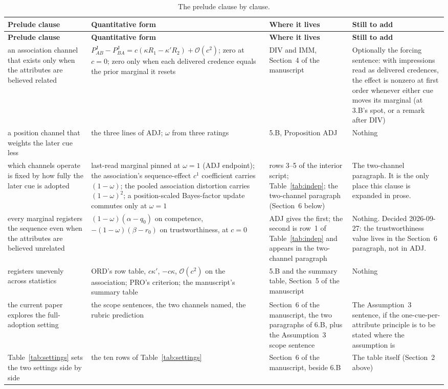 \documentclass[11pt,a4paper]{article}
\newcommand{\PJ}{P^{\mathrm{J}}}
\newcommand{\bigO}{\mathcal{O}}
\begin{document}
\small
\begin{longtable}{@{}L{3.3cm}L{4.2cm}L{4.0cm}L{4.4cm}@{}}
\caption{The prelude clause by clause.}\label{tab:map}\\
\toprule
\textbf{Prelude clause} & \textbf{Quantitative form} & \textbf{Where it lives} & \textbf{Still to add} \\
\midrule
\endfirsthead
\toprule
\textbf{Prelude clause} & \textbf{Quantitative form} & \textbf{Where it lives} & \textbf{Still to add} \\
\midrule
\endhead
an association channel that exists only when the attributes are believed
related &
$\PJ_{AB}-\PJ_{BA}=c(\kappa R_1-\kappa'R_2)+\bigO(c^2)$; zero at $c=0$; zero
only when each delivered credence equals the prior marginal it resets &
DIV and IMM, Section~4 of the manuscript &
Optionally the forcing sentence: with impressions read as delivered
credences, the effect is nonzero at first order whenever either cue moves
its marginal (at 3.B's spot, or a remark after DIV) \\
\addlinespace[3pt]
a position channel that weights the later cue less &
the three lines of ADJ; $\omega$ from three ratings &
5.B, Proposition ADJ &
Nothing \\
\addlinespace[3pt]
which channels operate is fixed by how fully the later cue is adopted &
last-read marginal pinned at $\omega=1$ (ADJ endpoint); the association's
sequence-effect $c^1$ coefficient carries $(1-\omega)$; the pooled
association distortion carries $(1-\omega)^2$; a position-scaled
Bayes-factor update commutes only at $\omega=1$ &
rows 3--5 of the interior script; Table~\ref{tab:indep}; the two-channel
paragraph (Section~6 below) &
The two-channel paragraph. It is the only place this clause is expanded in
prose. \\
\addlinespace[3pt]
every marginal registers the sequence even when the attributes are believed
unrelated &
$(1-\omega)(\alpha-q_0)$ on competence, $-(1-\omega)(\beta-r_0)$ on
trustworthiness, at $c=0$ &
ADJ gives the first; the second is row~1 of Table~\ref{tab:indep} and
appears in the two-channel paragraph &
Nothing. Decided 2026-09-27: the trustworthiness value lives in the Section~6
paragraph, not in ADJ. \\
\addlinespace[3pt]
registers unevenly across statistics &
ORD's row table, $c\kappa'$, $-c\kappa$, $\bigO(c^2)$ on the association;
PRO's criterion; the manuscript's summary table &
5.B and the summary table, Section~5 of the manuscript &
Nothing \\
\addlinespace[3pt]
the current paper explores the full-adoption setting &
the scope sentences, the two channels named, the rubric prediction &
Section~6 of the manuscript, the two paragraphs of 6.B, plus the
Assumption~3 scope sentence &
The Assumption~3 sentence, if the one-cue-per-attribute principle is to be
stated where the assumption is \\
\addlinespace[3pt]
Table~\ref{tab:settings} sets the two settings side by side &
the ten rows of Table~\ref{tab:settings} &
Section~6 of the manuscript, beside 6.B &
The table itself (Section~2 above) \\
\bottomrule
\end{longtable}
\normalsize
\end{document}
